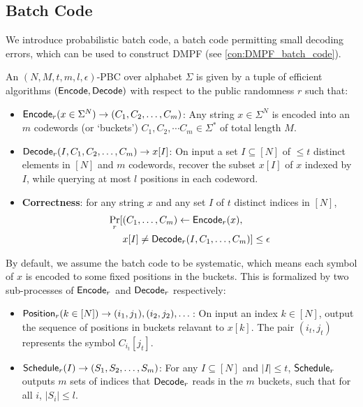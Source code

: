 \subsection{Batch Code}
We introduce probabilistic batch code, a batch code permitting small decoding errors, which can be used to construct DMPF (see \cref{con:DMPF_batch_code}). 
\begin{definition}
  An $(N,M,t,m,l,\epsilon)$-PBC over alphabet $\Sigma$ is given by a tuple of efficient algorithms $({\sf Encode},{\sf Decode})$ with respect to the public randomness $r$ such that:
  \begin{itemize}
    \item ${\sf Encode}_r(x\in\Sigma^N)\rightarrow (C_1,C_2,\dots,C_m)$: Any string $x\in\Sigma^N$ is encoded into an $m$ codewords (or `buckets') $C_1,C_2,\cdots C_m\in\Sigma^*$ of total length $M$.
    \item ${\sf Decode}_r(I,C_1,C_2,\dots,C_m)\rightarrow x[I]$: On input a set $I\subseteq[N]$ of $\le t$ distinct elements in $[N]$ and $m$ codewords, recover the subset $x[I]$ of $x$ indexed by $I$, while querying at most $l$ positions in each codeword. 
    \item \textbf{Correctness}: for any string $x$ and any set $I$ of $t$ distinct indices in $[N]$, 
    \[
    \begin{split}
      \Pr_r[&(C_1,\dots, C_m)\gets {\sf Encode}_r(x), \\
      &x[I]\not= {\sf Decode}_r(I,C_1,\dots,C_m)] \le \epsilon
    \end{split}
    \]
  \end{itemize}
  By default, we assume the batch code to be systematic, which means each symbol of $x$ is encoded to some fixed positions in the buckets. This is formalized by two sub-processes of ${\sf Encode}_r$ and ${\sf Decode}_r$ respectively: 
  \begin{itemize}
    \item ${\sf Position}_r(k\in[N])\rightarrow (i_1, j_1),(i_2,j_2),\dots$: On input an index $k\in[N]$, output the sequence of positions in buckets relavant to $x[k]$. The pair $(i_t, j_t)$ represents the symbol $C_{i_t}[j_t]$. 
    \item ${\sf Schedule}_r(I)\rightarrow (S_1,S_2,\dots, S_m)$: For any $I\subseteq [N]$ and $|I|\le t$, ${\sf Schedule}_r$ outputs $m$ sets of indices that ${\sf Decode}_r$ reads in the $m$ buckets, such that for all $i$, $|S_i|\le l$. 
  \end{itemize}
\end{definition}

